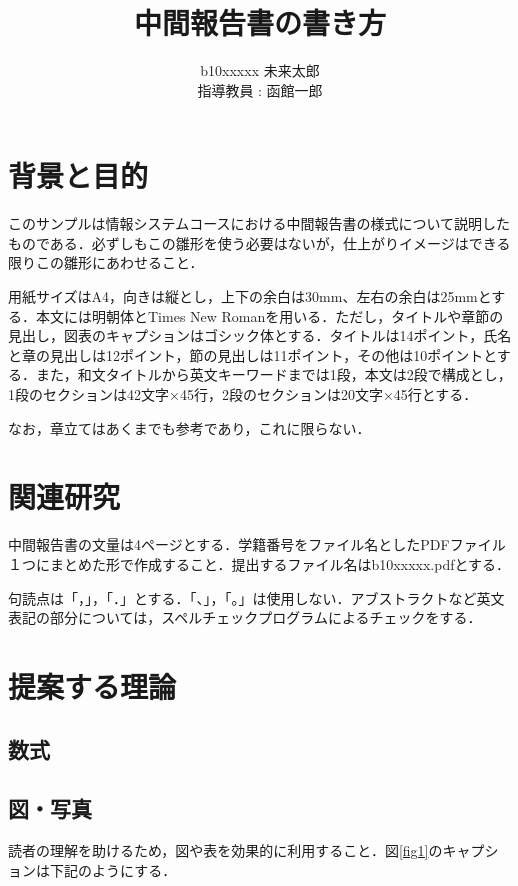 \documentclass[11pt]{jarticle}
\author{%
b10xxxxx 未来太郎\\指導教員 : 函館一郎
}
\title{中間報告書の書き方}
\begin{document}
\maketitle

\section{背景と目的}

このサンプルは情報システムコースにおける中間報告書の様式について説明したものである．必ずしもこの雛形を使う必要はないが，仕上がりイメージはできる限りこの雛形にあわせること．

用紙サイズはA4，向きは縦とし，上下の余白は30mm、左右の余白は25mmとする．本文には明朝体とTimes New Romanを用いる．ただし，タイトルや章節の見出し，図表のキャプションはゴシック体とする．タイトルは14ポイント，氏名と章の見出しは12ポイント，節の見出しは11ポイント，その他は10ポイントとする．また，和文タイトルから英文キーワードまでは1段，本文は2段で構成とし，1段のセクションは42文字×45行，2段のセクションは20文字×45行とする．

なお，章立てはあくまでも参考であり，これに限らない．

\section{関連研究}

中間報告書の文量は4ページとする．学籍番号をファイル名としたPDFファイル１つにまとめた形で作成すること．提出するファイル名はb10xxxxx.pdfとする．

句読点は「，」，「．」とする．「、」，「。」は使用しない．アブストラクトなど英文表記の部分については，スペルチェックプログラムによるチェックをする．

\section{提案する理論}

\subsection{数式}



\subsection{図・写真}

読者の理解を助けるため，図や表を効果的に利用すること．図\ref{fig1}のキャプションは下記のようにする．
\end{document}
